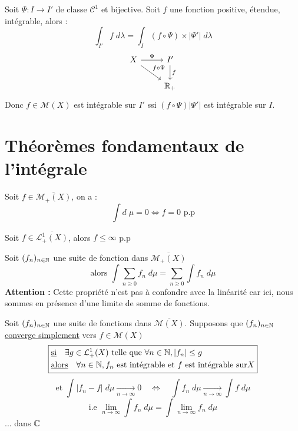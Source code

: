 \begin{theorem}
    Soit $\Psi : I \rightarrow I'$ de classe $\mathcal{C}^1$ et bijective. Soit $f$ une fonction positive, étendue, intégrable, alors :
        \[ \boxed{ \int_{I'} f \; d \lambda = \int_I (f \circ \Psi) \times |\Psi ' | \; d \lambda } \] 
    \[ 
		\begin{tikzcd}
			X \arrow[r, "\Psi"] \arrow[rd, "f \circ \Psi"] & I' \arrow[d, "f"]\\
                                                           & \R_+ 
		\end{tikzcd}
	\]
    Donc $f \in \mathcal{M}(X)$ est intégrable sur $I'$ ssi $(f \circ \Psi) |\Psi ' |$ est intégrable sur $I$.
\end{theorem}



\section{Théorèmes fondamentaux de l'intégrale}

\begin{theorem}
    Soit $f \in \overline{\mathcal{M}_+(X)}$, on a :
        \[ \int d \; \mu = 0 \Longleftrightarrow f = 0 \text{ p.p} \]
\end{theorem}

\begin{theorem}
    Soit $f \in \overline{\mathcal{L}_+^1(X)}$, alors $f \le \infty $ p.p 
\end{theorem}

\newpage

\begin{theorem}
    Soit $(f_n)_{n\in\mathbb{N}}$ une suite de fonction dans $\overline{\mathcal{M}_+(X)}$ 
        \[ \text{alors } \int \sum_{n \geq 0} f_n \; d \mu = \sum_{n \geq 0} \int f_n \; d \mu \] 
    \textbf{Attention :} Cette propriété n'est pas à confondre avec la linéarité car ici, nous sommes en présence d'une limite de somme de fonctions.
\end{theorem}

\begin{theorem}
    Soit $(f_n)_{n\in\mathbb{N}}$ une suite de fonctions dans $\overline{\mathcal{M}(X)}$.
    Supposons que $(f_n)_{n\in\mathbb{N}}$ \underline{converge simplement} vers $f \in \mathcal{M}(X)$ 
    \[ \boxed{
    \begin{aligned}
        & \text{\underline{si}} \quad  \exists g \in \mathcal{L}_+^1(X) \text{ telle que } \forall n \in \mathbb{N}, |f_n| \leq g \\
        & \text{\underline{alors}} \quad \forall n \in \mathbb{N}, f_n \text{ est intégrable et }  f \text{ est intégrable sur} X
    \end{aligned} }
    \]
    \[ \text{et } \int \Big| f_n - f \Big| \; d \mu \underset{n \to \infty}{\longrightarrow} 0 \quad \Longleftrightarrow \quad  \int f_n \; d \mu \underset{n \to \infty}{\longrightarrow} \int f \; d \mu \] 
    \[ \text{i.e } \lim_{n \to \infty} \int f_n \; d \mu = \int \lim_{n \to \infty} f_n \; d \mu \] 
    ... dans $\mathbb{C}$
\end{theorem}

